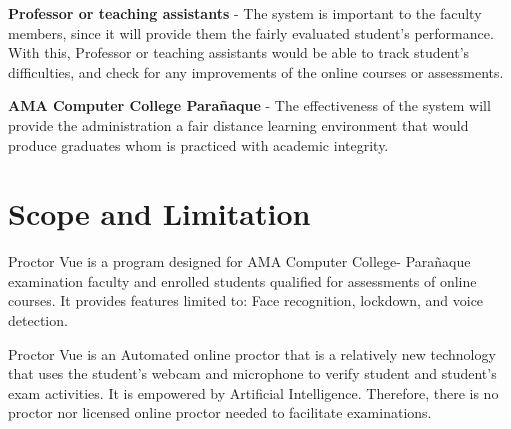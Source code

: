 \textbf{Professor or teaching assistants} - The system is important to the faculty members, since it will provide them the fairly evaluated student’s performance. With this, Professor or teaching assistants would be able to track student’s difficulties, and check for any improvements of the online courses or assessments.

\textbf{AMA Computer College Parañaque} - The effectiveness of the system will provide the administration a fair distance learning environment that would produce graduates whom is practiced with academic integrity.

\section{Scope and Limitation}

Proctor Vue is a program designed for AMA Computer College- Parañaque examination faculty and enrolled students qualified for assessments of online courses.
It provides features limited to: Face recognition, lockdown, and voice detection.

Proctor Vue is an Automated online proctor that is a relatively new technology that uses the student’s webcam and microphone to verify student and student’s exam activities.
It is empowered by Artificial Intelligence.
Therefore, there is no proctor nor licensed online proctor needed to facilitate examinations.


